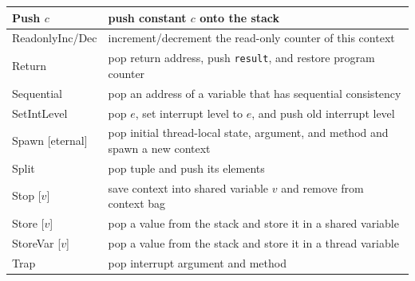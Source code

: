 \documentclass{report}
\begin{document}
{\begin{tabular}{|l|l|}
\hline
Push $c$ & push constant $c$ onto the stack \\
\hline
ReadonlyInc/Dec & increment/decrement the read-only counter of this context \\
\hline
Return & pop return address, push \texttt{result}, and restore program counter \\
\hline
Sequential & pop an address of a variable that has sequential consistency \\
\hline
SetIntLevel & pop $e$, set interrupt level to $e$, and push old interrupt level \\
\hline
Spawn [eternal] & pop initial thread-local state, argument, and method and spawn a new context \\
\hline
Split & pop tuple and push its elements \\
\hline
Stop [$v$] & save context into shared variable $v$ and remove from context bag \\
\hline
Store [$v$] & pop a value from the stack and store it in a shared variable \\
\hline
StoreVar [$v$] & pop a value from the stack and store it in a thread variable \\
\hline
Trap & pop interrupt argument and method \\
\hline
\end{tabular}
}
\end{document}
